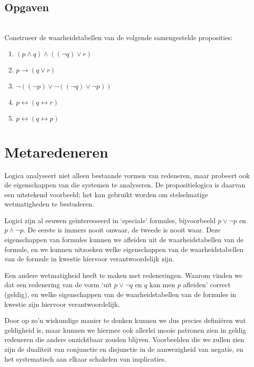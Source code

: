 \subsection{Opgaven}
\begin{exercise}[Waarheidstabellen]\mbox{}\\
Construeer de waarheidstabellen van de volgende samengestelde proposities:
\begin{enumerate}[label=\textit{\alph*.}]
\item $(p\land q)\land((\neg q)\lor r)$
\item $p\rightarrow(q\lor r)$
\item $\neg((\neg p)\lor\neg((\neg q)\lor\neg p))$
\item $p\leftrightarrow(q\leftrightarrow r)$
\item $p\leftrightarrow(q\leftrightarrow p)$
\end{enumerate}
\end{exercise}

\section{Metaredeneren}
Logica analyseert niet alleen bestaande vormen van redeneren, maar probeert ook de eigenschappen van die systemen te analyseren. De propositielogica is daarvan een uitstekend voorbeeld; het kan gebruikt worden om stelselmatige wetmatigheden te bestuderen.

Logici zijn al eeuwen ge\"interesseerd in `speciale' formules, bijvoorbeeld $p\lor\neg p$ en $p\land\neg p$. De eerste is immers nooit onwaar, de tweede is nooit waar. Deze eigenschappen van formules kunnen we afleiden uit de waarheidstabellen van de formule, en we kunnen uitzoeken welke eigenschappen van de waarheidstabellen van de formule in kwestie hiervoor verantwoordelijk zijn.

Een andere wetmatigheid heeft te maken met redeneringen. Waarom vinden we dat een redenering van de vorm `uit $p\lor\neg q$ en $q$ kan men $p$ afleiden' correct (geldig), en welke eigenschappen van de waarheidstabellen van de formules in kwestie zijn hiervoor verantwoordelijk.

Door op zo'n wiskundige manier te denken kunnen we dus precies defini\"eren wat geldigheid is, maar kunnen we hiermee ook allerlei mooie patronen zien in geldig redeneren die anders onzichtbaar zouden blijven. Voorbeelden die we zullen zien zijn de dualiteit van conjunctie en disjunctie in de aanwezigheid van negatie, en het systematisch aan elkaar schakelen van implicaties.

